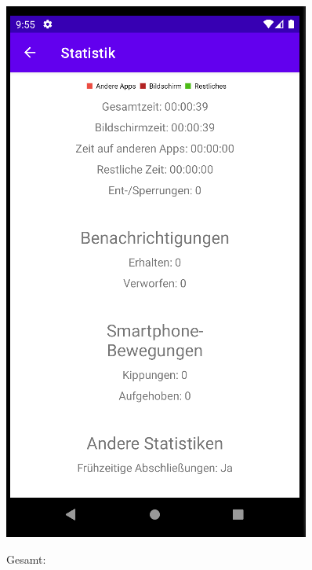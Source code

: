 \documentclass[ngerman]{tutorial}
\begin{document}
\begin{center}
    \includegraphics[scale=0.45]{stats_phase_2.png}
\end{center}
\newpage
\centering Gesamt:
\end{document}
